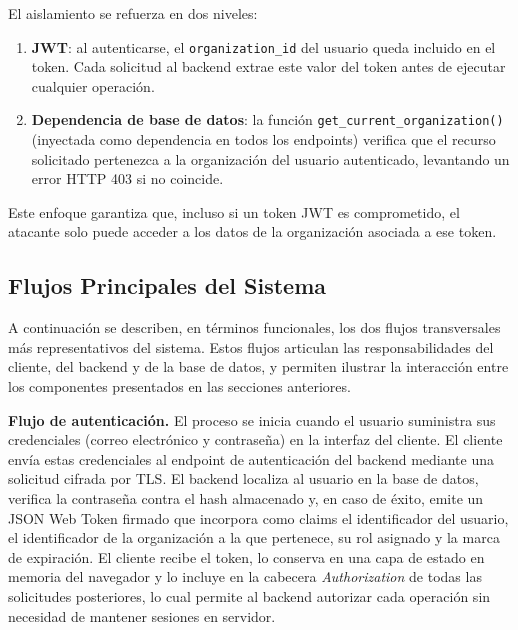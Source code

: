 El aislamiento se refuerza en dos niveles:

\begin{enumerate}
\def\labelenumi{\arabic{enumi}.}
\tightlist
\item
  \textbf{JWT}: al autenticarse, el \texttt{organization\_id} del usuario queda incluido en el token. Cada solicitud al backend extrae este valor del token antes de ejecutar cualquier operación.
\item
  \textbf{Dependencia de base de datos}: la función \texttt{get\_current\_organization()} (inyectada como dependencia en todos los endpoints) verifica que el recurso solicitado pertenezca a la organización del usuario autenticado, levantando un error HTTP 403 si no coincide.
\end{enumerate}

Este enfoque garantiza que, incluso si un token JWT es comprometido, el atacante solo puede acceder a los datos de la organización asociada a ese token.

\subsection{Flujos Principales del Sistema}\label{flujos-principales-del-sistema}

A continuación se describen, en términos funcionales, los dos flujos transversales más representativos del sistema. Estos flujos articulan las responsabilidades del cliente, del backend y de la base de datos, y permiten ilustrar la interacción entre los componentes presentados en las secciones anteriores.

\textbf{Flujo de autenticación.} El proceso se inicia cuando el usuario suministra sus credenciales (correo electrónico y contraseña) en la interfaz del cliente. El cliente envía estas credenciales al endpoint de autenticación del backend mediante una solicitud cifrada por TLS. El backend localiza al usuario en la base de datos, verifica la contraseña contra el hash almacenado y, en caso de éxito, emite un JSON Web Token firmado que incorpora como claims el identificador del usuario, el identificador de la organización a la que pertenece, su rol asignado y la marca de expiración. El cliente recibe el token, lo conserva en una capa de estado en memoria del navegador y lo incluye en la cabecera \emph{Authorization} de todas las solicitudes posteriores, lo cual permite al backend autorizar cada operación sin necesidad de mantener sesiones en servidor.

